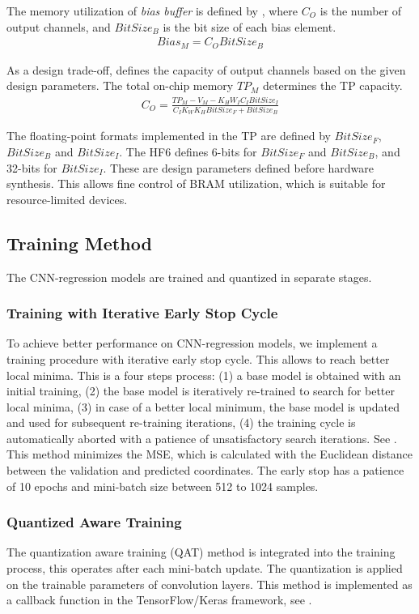 The memory utilization of \emph{bias buffer} is defined by , where $C_{O}$ is the number of output channels, and $BitSize_{B}$ is the bit size of each bias element.
\begin{eqnarray} \label{eq:bias_memory}
Bias_{M}=C_{O}BitSize_{B}
\end{eqnarray}

As a design trade-off,  defines the capacity of output channels based on the given design parameters. The total on-chip memory $TP_{M}$ determines the TP capacity.
\begin{eqnarray} \label{eq:channel_in_memory}
C_{O}=\frac{TP_{M}-V_{M}-K_{H}W_{I}C_{I}BitSize_{I}}{C_{I}K_{W}K_{H}BitSize_{F}+BitSize_{B}}
\end{eqnarray}

The floating-point formats implemented in the TP are defined by $BitSize_F$, $BitSize_B$ and $BitSize_I$. The HF6 defines 6-bits for $BitSize_F$ and $BitSize_B$, and 32-bits for $BitSize_I$. These are design parameters defined before hardware synthesis. This allows fine control of BRAM utilization, which is suitable for resource-limited devices.

\subsection{Training Method}
The CNN-regression models are trained and quantized in separate stages.
\subsubsection{Training with Iterative Early Stop Cycle}
To achieve better performance on CNN-regression models, we implement a training procedure with iterative early stop cycle. This allows to reach better local minima. This is a four steps process: (1) a base model is obtained with an initial training, (2) the base model is iteratively re-trained to search for better local minima, (3) in case of a better local minimum, the base model is updated and used for subsequent re-training iterations, (4) the training cycle is automatically aborted with a patience of unsatisfactory search iterations. See . This method minimizes the MSE, which is calculated with the Euclidean distance between the validation and predicted coordinates. The early stop has a patience of 10 epochs and mini-batch size between 512 to 1024 samples.

\subsubsection{Quantized Aware Training}
The quantization aware training (QAT) method is integrated into the training process, this operates after each mini-batch update. The quantization is applied on the trainable parameters of convolution layers. This method is implemented as a callback function in the TensorFlow/Keras framework, see .

